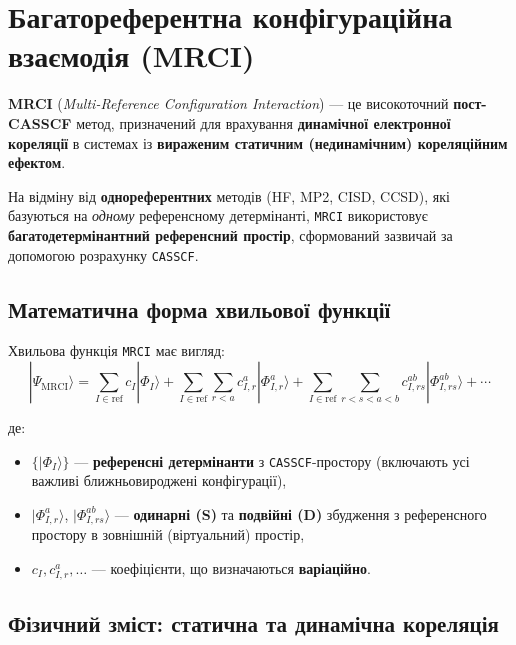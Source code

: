 
\section{Багатореферентна конфігураційна взаємодія (MRCI)}

\textbf{MRCI} (\textit{Multi-Reference Configuration Interaction}) --- це високоточний \textbf{пост-CASSCF} метод, призначений для врахування \textbf{динамічної електронної кореляції} в системах із \textbf{вираженим статичним (нединамічним) кореляційним ефектом}.


На відміну від \textbf{однореферентних} методів (HF, MP2, CISD, CCSD), які базуються на \emph{одному} референсному детермінанті, \texttt{MRCI} використовує \textbf{багатодетермінантний референсний простір}, сформований зазвичай за допомогою розрахунку \texttt{CASSCF}.

\subsection{Математична форма хвильової функції}

Хвильова функція \texttt{MRCI} має вигляд:
\begin{equation}
|\Psi_{\text{MRCI}}\rangle = \sum_{I \in \text{ref}} c_I |\Phi_I\rangle
+ \sum_{I \in \text{ref}} \sum_{r<a} c_{I,r}^{a} |\Phi_{I,r}^{a}\rangle
+ \sum_{I \in \text{ref}} \sum_{r<s<a<b} c_{I,rs}^{ab} |\Phi_{I,rs}^{ab}\rangle + \cdots
\end{equation}

де:
\begin{itemize}
    \item $\{|\Phi_I\rangle\}$ --- \textbf{референсні детермінанти} з \texttt{CASSCF}-простору (включають усі важливі ближньовироджені конфігурації),
    \item $|\Phi_{I,r}^{a}\rangle$, $|\Phi_{I,rs}^{ab}\rangle$ --- \textbf{одинарні (S)} та \textbf{подвійні (D)} збудження з референсного простору в зовнішній (віртуальний) простір,
    \item $c_I, c_{I,r}^{a}, \ldots$ --- коефіцієнти, що визначаються \textbf{варіаційно}.
\end{itemize}

\subsection{Фізичний зміст: статична та динамічна кореляція}

